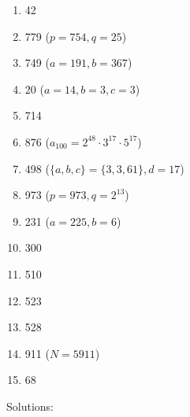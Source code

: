 \documentclass{article}
\begin{document}
\begin{enumerate}

\item 42

\item 779 ($p=754, q=25$)

\item 749 ($a=191, b=367$)

\item 20 ($a=14, b=3, c=3$)

\item 714

\item 876 ($a_{100} = 2^{48} \cdot 3^{17} \cdot 5^{17}$)

\item 498 ($\{ a,b,c \} = \{ 3,3,61 \}, d=17$)

\item 973 ($p=973, q=2^{13}$)

\item 231 ($a=225, b=6$)

\item 300

\item 510

\item 523

\item 528

\item 911 ($N = 5911$)

\item 68

\end{enumerate}

\newpage


Solutions:

\end{document}
